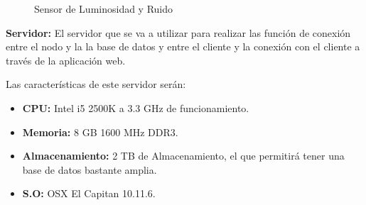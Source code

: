 \begin{itemize}
	\begin{figure}[!h]
		\centering
		\caption{Sensor de Luminosidad y Ruido}
		\label{f:sensores}
	\end{figure}
	
\end{itemize}

\textbf{Servidor:} El servidor que se va a utilizar para realizar las función de conexión entre el nodo y la la base de datos y entre el cliente y la conexión con el cliente a través de la aplicación web.

Las características de este servidor serán:

\begin{itemize}
	\item \textbf{CPU:} Intel i5 2500K a 3.3 GHz de funcionamiento.
	\item \textbf{Memoria:} 8 GB 1600 MHz DDR3.
	\item \textbf{Almacenamiento:} 2 TB de Almacenamiento, el que permitirá tener una base de datos bastante amplia.
	\item \textbf{S.O:} OSX El Capitan 10.11.6.
\end{itemize}


